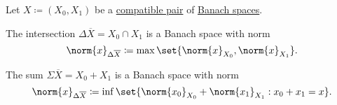 \begin{proposition}\label{def:banach_space_sum_and_intersection_norms}
  Let \( X \coloneqq (X_0, X_1) \) be a \hyperref[def:interpolated_topological_vector_space/compatibility]{compatible pair} of \hyperref[def:banach_space]{Banach spaces}.

  \begin{thmenum}
     The intersection \( \Delta \overline{X} = X_0 \cap X_1 \) is a Banach space with norm
    \begin{equation}\label{eq:def:banach_space_sum_and_intersection_norms/intersection}
      \norm{x}_{\Delta \overline{X}} \coloneqq \max \set{ \norm{x}_{X_0}, \norm{x}_{X_1} }.
    \end{equation}

     The sum \( \Sigma \overline{X} = X_0 + X_1 \) is a Banach space with norm
    \begin{equation}\label{eq:def:banach_space_sum_and_intersection_norms/sum}
      \norm{x}_{\Delta \overline{X}} \coloneqq \inf \set{ \norm{x_0}_{X_0} + \norm{x_1}_{X_1} : x_0 + x_1 = x }.
    \end{equation}
  \end{thmenum}
\end{proposition}

